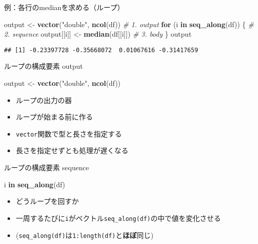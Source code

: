 \documentclass[ignorenonframetext,]{beamer}
\newenvironment{Shaded}{\begin{snugshade}}{\end{snugshade}}
\newcommand{\KeywordTok}[1]{\textcolor[rgb]{0.13,0.29,0.53}{\textbf{#1}}}
\newcommand{\StringTok}[1]{\textcolor[rgb]{0.31,0.60,0.02}{#1}}
\newcommand{\CommentTok}[1]{\textcolor[rgb]{0.56,0.35,0.01}{\textit{#1}}}
\newcommand{\ControlFlowTok}[1]{\textcolor[rgb]{0.13,0.29,0.53}{\textbf{#1}}}
\newcommand{\NormalTok}[1]{#1}
\providecommand{\tightlist}{%
  \setlength{\itemsep}{0pt}\setlength{\parskip}{0pt}}
\begin{document}
\begin{frame}[fragile]{例：各行のmedianを求める（ループ）}

\begin{Shaded}
\begin{Highlighting}[]
\NormalTok{output <-}\StringTok{ }\KeywordTok{vector}\NormalTok{(}\StringTok{"double"}\NormalTok{, }\KeywordTok{ncol}\NormalTok{(df))  }\CommentTok{# 1. output}
\ControlFlowTok{for}\NormalTok{ (i }\ControlFlowTok{in} \KeywordTok{seq_along}\NormalTok{(df)) \{            }\CommentTok{# 2. sequence}
\NormalTok{  output[[i]] <-}\StringTok{ }\KeywordTok{median}\NormalTok{(df[[i]])      }\CommentTok{# 3. body}
\NormalTok{\}}
\NormalTok{output}
\end{Highlighting}
\end{Shaded}

\begin{verbatim}
## [1] -0.23397728 -0.35668072  0.01067616 -0.31417659
\end{verbatim}

\end{frame}

\begin{frame}[fragile]{ループの構成要素 output}

\begin{Shaded}
\begin{Highlighting}[]
\NormalTok{output <-}\StringTok{ }\KeywordTok{vector}\NormalTok{(}\StringTok{"double"}\NormalTok{, }\KeywordTok{ncol}\NormalTok{(df))}
\end{Highlighting}
\end{Shaded}

\begin{itemize}
\tightlist
\item
  ループの出力の器
\item
  ループが始まる前に作る
\item
  \texttt{vector}関数で型と長さを指定する
\item
  長さを指定せずとも処理が遅くなる
\end{itemize}

\end{frame}

\begin{frame}[fragile]{ループの構成要素 sequence}

\begin{Shaded}
\begin{Highlighting}[]
\NormalTok{i }\ControlFlowTok{in} \KeywordTok{seq_along}\NormalTok{(df)}
\end{Highlighting}
\end{Shaded}

\begin{itemize}
\tightlist
\item
  どうループを回すか
\item
  一周するたびに\texttt{i}がベクトル\texttt{seq\_along(df)}の中で値を変化させる
\item
  (\texttt{seq\_along(df)}は\texttt{1:length(df)}と\textbf{ほぼ}同じ)
\end{itemize}

\end{frame}
\end{document}
